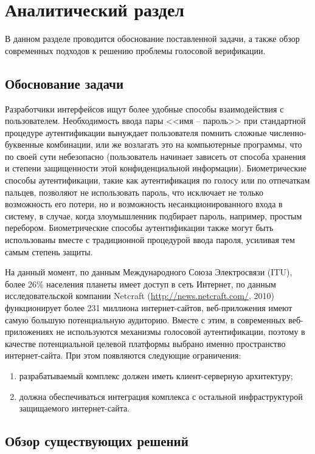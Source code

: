 \chapter{Аналитический раздел}

В данном разделе проводится обоснование поставленной задачи, а также обзор современных подходов к решению проблемы голосовой верификации.

\section{Обоснование задачи}

Разработчики интерфейсов ищут более удобные способы взаимодействия с пользователем. Необходимость ввода пары <<имя -- пароль>> при стандартной процедуре аутентификации вынуждает пользователя помнить сложные численно-буквенные комбинации, или же возлагать это на компьютерные программы, что по своей сути небезопасно (пользователь начинает зависеть от способа хранения и степени защищенности этой конфиденциальной информации). Биометрические способы аутентификации, такие как аутентификация по голосу или по отпечаткам пальцев, позволяют не использовать пароль, что исключает не только возможность его потери, но и возможность несанкционированного входа в систему, в случае, когда злоумышленник подбирает пароль, например, простым перебором. Биометрические способы аутентификации также могут быть использованы вместе с традиционной процедурой ввода пароля, усиливая тем самым степень защиты.

На данный момент, по данным Международного Союза Электросвязи (ITU), более 26\% населения планеты имеет доступ в сеть Интернет, по данным исследовательской компании Netcraft (\url{http://news.netcraft.com/}, 2010) функционирует более 231 миллиона интернет-сайтов, веб-приложения имеют самую большую потенциальную аудиторию. Вместе с этим, в современных веб-приложениях не используются механизмы голосовой аутентификации, поэтому в качестве потенциальной целевой платформы выбрано именно пространство интернет-сайта. При этом появляются следующие ограничения:

\begin{enumerate}
\item разрабатываемый комплекс должен иметь клиент-серверную архитектуру;
\item должна обеспечиваться интеграция комплекса с остальной инфраструктурой защищаемого интернет-сайта.
\end{enumerate}

\section{Обзор существующих решений}
\label{sec:overview}

